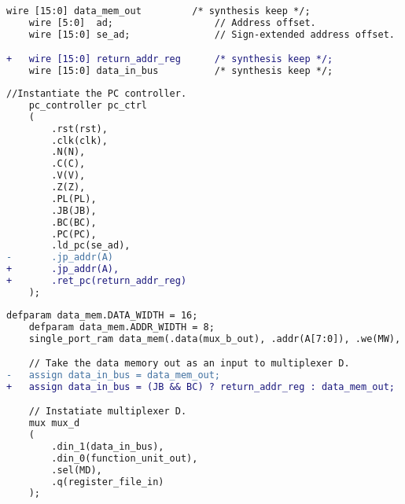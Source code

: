 \begin{lstlisting}[language=diff, firstnumber=50]
    wire [15:0] data_mem_out         /* synthesis keep */;
    wire [5:0]  ad;                  // Address offset.
    wire [15:0] se_ad;               // Sign-extended address offset.

+   wire [15:0] return_addr_reg      /* synthesis keep */;
    wire [15:0] data_in_bus          /* synthesis keep */;
\end{lstlisting}

\begin{lstlisting}[language=diff, firstnumber=62]
    //Instantiate the PC controller.
    pc_controller pc_ctrl
    (
        .rst(rst),
        .clk(clk),
        .N(N),
        .C(C),
        .V(V),
        .Z(Z),
        .PL(PL),
        .JB(JB),
        .BC(BC),
        .PC(PC),
        .ld_pc(se_ad),
-       .jp_addr(A)
+       .jp_addr(A),
+       .ret_pc(return_addr_reg)
    );
\end{lstlisting}

\begin{lstlisting}[language=diff, firstnumber=154]
    defparam data_mem.DATA_WIDTH = 16;
    defparam data_mem.ADDR_WIDTH = 8;
    single_port_ram data_mem(.data(mux_b_out), .addr(A[7:0]), .we(MW), .clk(clk), .q(data_mem_out));

    // Take the data memory out as an input to multiplexer D.
-   assign data_in_bus = data_mem_out;
+   assign data_in_bus = (JB && BC) ? return_addr_reg : data_mem_out;

    // Instatiate multiplexer D.
    mux mux_d
    (
        .din_1(data_in_bus),
        .din_0(function_unit_out),
        .sel(MD),
        .q(register_file_in)
    );
\end{lstlisting}

